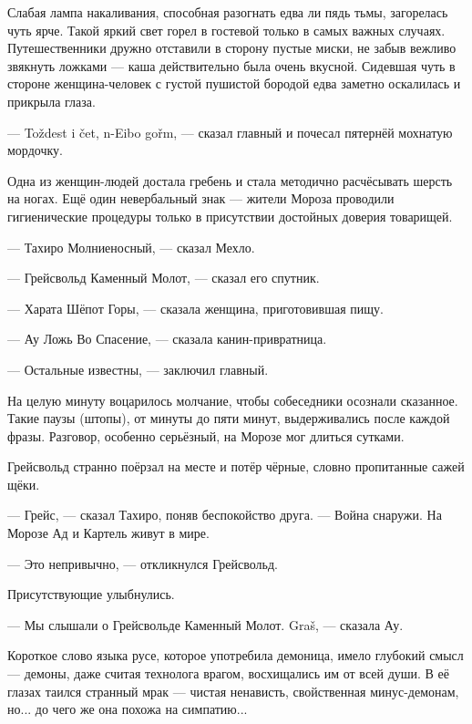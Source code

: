 Слабая лампа накаливания, способная разогнать едва ли пядь тьмы, загорелась чуть ярче.
Такой яркий свет горел в гостевой только в самых важных случаях.
Путешественники дружно отставили в сторону пустые миски, не забыв вежливо звякнуть ложками --- каша действительно была очень вкусной.
Сидевшая чуть в стороне женщина-человек с густой пушистой бородой едва заметно оскалилась и прикрыла глаза.

--- To\v{z}dest i \v{c}et, n-Eibo go\v{r}m\FM, --- сказал главный и почесал пятернёй мохнатую мордочку.

Одна из женщин-людей достала гребень и стала методично расчёсывать шерсть на ногах.
Ещё один невербальный знак --- жители Мороза проводили гигиенические процедуры только в присутствии достойных доверия товарищей.

--- Тахиро Молниеносный, --- сказал Мехло.

--- Грейсвольд Каменный Молот, --- сказал его спутник.

--- Харата Шёпот Горы, --- сказала женщина, приготовившая пищу.

--- Ау Ложь Во Спасение, --- сказала канин-привратница.

--- Остальные известны, --- заключил главный.

На целую минуту воцарилось молчание, чтобы собеседники осознали сказанное.
Такие паузы (штопы), от минуты до пяти минут, выдерживались после каждой фразы.
Разговор, особенно серьёзный, на Морозе мог длиться сутками\FM.

Грейсвольд странно поёрзал на месте и потёр чёрные, словно пропитанные сажей щёки.

--- Грейс, --- сказал Тахиро, поняв беспокойство друга.
--- Война снаружи.
На Морозе Ад и Картель живут в мире.

--- Это непривычно, --- откликнулся Грейсвольд.

Присутствующие улыбнулись.

--- Мы слышали о Грейсвольде Каменный Молот.
Gra\v{s}\FM, --- сказала Ау.

Короткое слово языка русе, которое употребила демоница, имело глубокий смысл --- демоны, даже считая технолога врагом, восхищались им от всей души.
В её глазах таился странный мрак --- чистая ненависть, свойственная минус-демонам, но... до чего же она похожа на симпатию...

